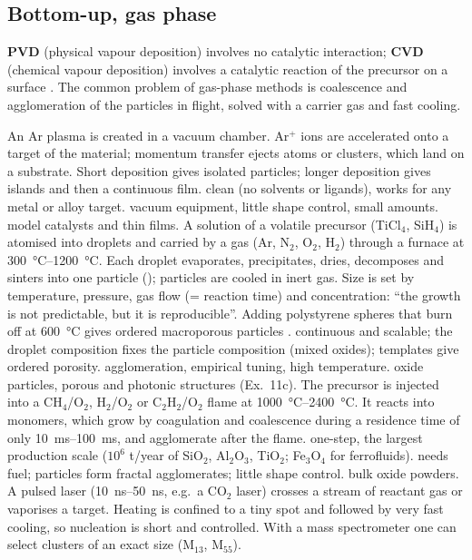 \subsection{Bottom-up, gas phase}
\textbf{PVD} (physical vapour deposition) involves no catalytic interaction; \textbf{CVD} (chemical vapour deposition) involves
a catalytic reaction of the precursor on a surface . The common problem of gas-phase methods is coalescence and
agglomeration of the particles in flight, solved with a carrier gas and fast cooling.

{An Ar plasma is created in a vacuum chamber. Ar$^+$ ions are accelerated onto a target of the material; momentum transfer ejects
atoms or clusters, which land on a substrate. Short deposition gives isolated particles; longer deposition gives islands and
then a continuous film.}
{clean (no solvents or ligands), works for any metal or alloy target.}
{vacuum equipment, little shape control, small amounts.}
{model catalysts and thin films.}
{A solution of a volatile precursor (TiCl$_4$, SiH$_4$) is atomised into droplets and carried by a gas (Ar, N$_2$, O$_2$, H$_2$)
through a furnace at \SIrange{300}{1200}{\celsius}. Each droplet evaporates, precipitates, dries, decomposes and sinters
into one particle (); particles are cooled in inert gas. Size is set by temperature, pressure,
gas flow (= reaction time) and concentration: ``the growth is not predictable, but it is reproducible''. Adding polystyrene spheres
that burn off at \SI{600}{\celsius} gives ordered macroporous particles .}
{continuous and scalable; the droplet composition fixes the particle composition (mixed oxides); templates give ordered porosity.}
{agglomeration, empirical tuning, high temperature.}
{oxide particles, porous and photonic structures (Ex.~11c).}
{The precursor is injected into a CH$_4$/O$_2$, H$_2$/O$_2$ or C$_2$H$_2$/O$_2$ flame at \SIrange{1000}{2400}{\celsius}. It reacts into
monomers, which grow by coagulation and coalescence during a residence time of only \SIrange{10}{100}{ms}, and agglomerate after the
flame.}
{one-step, the largest production scale ($10^6$ t/year of SiO$_2$, Al$_2$O$_3$, TiO$_2$; Fe$_3$O$_4$ for ferrofluids).}
{needs fuel; particles form fractal agglomerates; little shape control.}
{bulk oxide powders.}
{A pulsed laser (\SIrange{10}{50}{ns}, e.g.\ a CO$_2$ laser) crosses a stream of reactant gas or vaporises a target. Heating is
confined to a tiny spot and followed by very fast cooling, so nucleation is short and controlled. With a mass spectrometer one can
select clusters of an exact size (M$_{13}$, M$_{55}$).}
